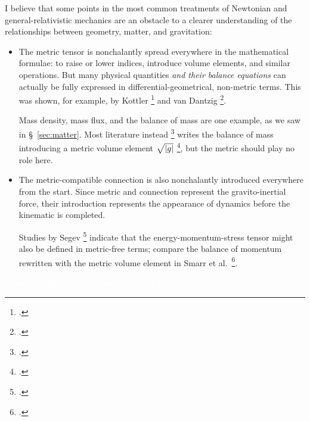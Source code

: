 \documentclass[\ifafour a4paper,12pt,\else a5paper,10pt,\fi%
onecolumn,oneside,article,%
british%
]{memoir}
\theoremstyle{remark}
\theoremstyle{innote}
\newcommand*{\citep}{\footcites}
\newcommand*{\citey}{\footcites}%
\newcommand*{\di}{\mathrm{d}}%
\DeclarePairedDelimiter\abs{\lvert}{\rvert}
\renewcommand*{\|}[1][]{\nonscript\,#1\vert\nonscript\;\mathopen{}}
\newcommand*{\sect}{\S}%
\newcommand*{\eg}{{e.g.}}
\newcommand*{\cf}{{cf.}}
\newcommand*{\etal}{{et al.}}
\newcommand*{\Li}{\mathrm{L}}
\newcommand*{\yvv}{n}
\newcommand*{\yv}{\bm{\yvv}}
\begin{document}
I believe that some points in the most common treatments of Newtonian and
general-relativistic mechanics are an obstacle to a clearer understanding
of the relationships between geometry, matter, and gravitation:
\begin{itemize}[para]
\item The metric tensor is nonchalantly spread everywhere in the
  mathematical formulae: to raise or lower indices, introduce volume
  elements, and similar operations. But many physical quantities \emph{and
    their balance equations} can actually be fully expressed in
  differential-geometrical, non-metric terms. This was shown, for example,
  by Kottler \citey{kottler1922,kottler1922b} and van Dantzig
  \citey{vandantzig1934,vandantzig1934b,vandantzig1934c,vandantzig1934d,vandantzig1934e,vandantzig1937,schoutenetal1940,vandantzig1954}.

  Mass density, mass flux, and the balance of mass are one example, as we
  saw in \sect~\ref{sec:matter}. Most literature instead
  \citep[\eg,][p.~171]{smarretal1980} writes the balance of mass introducing
  a metric volume element $\sqrt{\abs{g}}$ \citep[\cf][\sect~V.B.4,
  pp.~317--318]{choquetbruhatetal1977_r1996}, but the metric should play no
  role here.

\item The metric-compatible connection is also nonchalantly introduced
  everywhere from the start. Since metric and connection represent the
  gravito-inertial force, their introduction represents the appearance of
  dynamics before the kinematic is completed.

  Studies by Segev \citey{segev2002} indicate that the
  energy-momentum-stress tensor might also be defined in metric-free terms;
  compare the balance of momentum rewritten with the metric volume element
  in Smarr \etal\ \citey[p.~171]{smarretal1980}.
\end{itemize}

\textcolor{white}{If you find this you can claim a postcard from me.}

\end{document}
